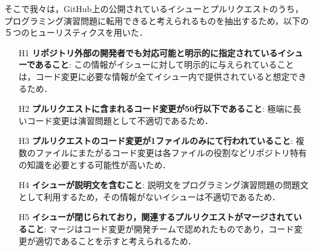 そこで我々は，GitHub上の公開されているイシューとプルリクエストのうち，プログラミング演習問題に転用できると考えられるものを抽出するため，以下の５つのヒューリスティクスを用いた．
\begin{enumerate}
\item[H1] \textbf{リポジトリ外部の開発者でも対応可能と明示的に指定されているイシューであること}: この情報がイシューに対して明示的に与えられていることは，コード変更に必要な情報が全てイシュー内で提供されていると想定できるため．
\item[H2] \textbf{プルリクエストに含まれるコード変更が50行以下であること}: 極端に長いコード変更は演習問題として不適切であるため．
\item[H3] \textbf{プルリクエストのコード変更が1ファイルのみにて行われていること}: 複数のファイルにまたがるコード変更は各ファイルの役割などリポジトリ特有の知識を必要とする可能性が高いため．
\item[H4] \textbf{イシューが説明文を含むこと}: 説明文をプログラミング演習問題の問題文として利用するため，その情報がないイシューは不適切であるため．
\item[H5]  \textbf{イシューが閉じられており，関連するプルリクエストがマージされていること}: マージはコード変更が開発チームで認めれたものであり，コード変更が適切であることを示すと考えられるため．
\end{enumerate}

